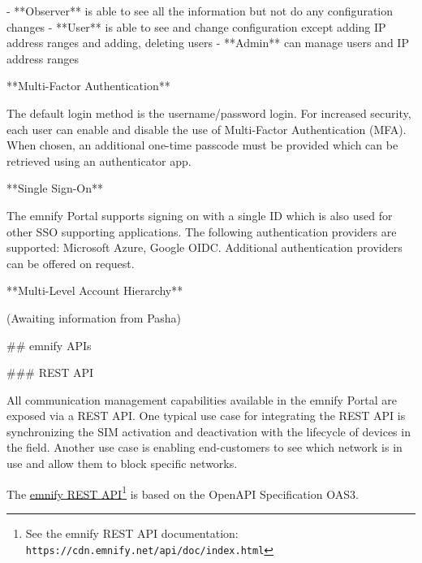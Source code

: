 \documentclass[11pt, oneside]{article}   	%
\newcommand{\addspace}{\vspace{2mm}}
\begin{document}
\addspace
\begin{markdown}
- **Observer** is able to see all the information but not do any configuration changes
- **User** is able to see and change configuration except adding IP address ranges and adding, deleting users 
- **Admin** can manage users and IP address ranges
\end{markdown}
\addspace
\begin{markdown}

**Multi-Factor Authentication**

The default login method is the username/password login.
For increased security, each user can enable and disable the use of Multi-Factor Authentication (MFA).
When chosen, an additional one-time passcode must be provided which can be retrieved using an authenticator app. 

**Single Sign-On** 

The emnify Portal supports signing on with a single ID which is also used for other SSO supporting applications. 
The following authentication providers are supported: Microsoft Azure, Google OIDC.
Additional authentication providers can be offered on request. 

**Multi-Level Account Hierarchy**

(Awaiting information from Pasha)

## emnify APIs

### REST API

All communication management capabilities available in the emnify Portal are exposed via a REST API.
One typical use case for integrating the REST API is synchronizing the SIM activation and deactivation with the lifecycle of devices in the field.
Another use case is enabling end-customers to see which network is in use and allow them to block specific networks.
\end{markdown}

The \href{https://cdn.emnify.net/api/doc/index.html}{emnify REST API}\footnote{See the emnify REST API documentation: \texttt{https://cdn.emnify.net/api/doc/index.html}} is based on the OpenAPI Specification OAS3.
\end{document}
